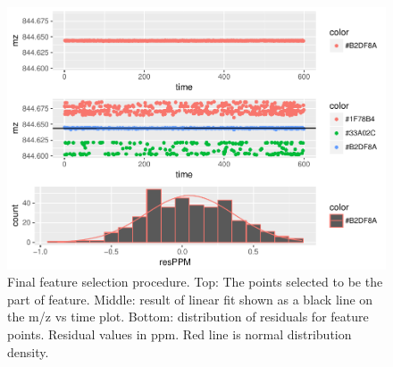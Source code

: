 \documentclass[]{article}
\newenvironment{Shaded}{\begin{snugshade}}{\end{snugshade}}
\newcommand{\KeywordTok}[1]{\textcolor[rgb]{0.13,0.29,0.53}{\textbf{#1}}}
\newcommand{\DataTypeTok}[1]{\textcolor[rgb]{0.13,0.29,0.53}{#1}}
\newcommand{\DecValTok}[1]{\textcolor[rgb]{0.00,0.00,0.81}{#1}}
\newcommand{\FloatTok}[1]{\textcolor[rgb]{0.00,0.00,0.81}{#1}}
\newcommand{\StringTok}[1]{\textcolor[rgb]{0.31,0.60,0.02}{#1}}
\newcommand{\ControlFlowTok}[1]{\textcolor[rgb]{0.13,0.29,0.53}{\textbf{#1}}}
\newcommand{\OperatorTok}[1]{\textcolor[rgb]{0.81,0.36,0.00}{\textbf{#1}}}
\newcommand{\NormalTok}[1]{#1}
\begin{document}
\begin{Shaded}
\end{Shaded}
\begin{figure}[H]
\begin{center}
\includegraphics{Supplementary_document_files/figure-latex/filter.lm-1.pdf}
\caption{Final feature selection procedure. Top: The points selected to be the part of feature.
Middle: result of linear fit shown as a black line on the m/z vs time plot.
Bottom: distribution of residuals for feature points. Residual values in ppm. Red line is normal distribution density. }
\label{fig:lin.feature.844}
\end{center}
\end{figure}
\end{document}
